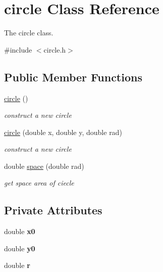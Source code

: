 \hypertarget{classcircle}{}\section{circle Class Reference}
\label{classcircle}


The circle class.  




{\ttfamily \#include $<$circle.\+h$>$}

\subsection*{Public Member Functions}
\begin{DoxyCompactItemize}
\item 
\mbox{\label{classcircle_a4e0786fc75051f3bbe5de2e08ef9712d}} 
\mbox{\hyperlink{classcircle_a4e0786fc75051f3bbe5de2e08ef9712d}{circle}} ()
\begin{DoxyCompactList}\small\item\em construct a new circle \end{DoxyCompactList}\item 
\mbox{\hyperlink{classcircle_a0a7895011a68519c1d3dd414ea2877e5}{circle}} (double x, double y, double rad)
\begin{DoxyCompactList}\small\item\em construct a new circle \end{DoxyCompactList}\item 
double \mbox{\hyperlink{classcircle_a4e7f858c884f2e958f9da9f70b0ff1dd}{space}} (double rad)
\begin{DoxyCompactList}\small\item\em get space area of ciecle \end{DoxyCompactList}\end{DoxyCompactItemize}
\subsection*{Private Attributes}
\begin{DoxyCompactItemize}
\item 
\mbox{\label{classcircle_a3934aec6524a4e3b74d2534c99df9864}} 
double {\bfseries x0}
\item 
\mbox{\label{classcircle_a553f975d0d74316e3286c748b604d651}} 
double {\bfseries y0}
\item 
\mbox{\label{classcircle_a5f252f6cf93b81949dbf334c74931f18}} 
double {\bfseries r}
\end{DoxyCompactItemize}


